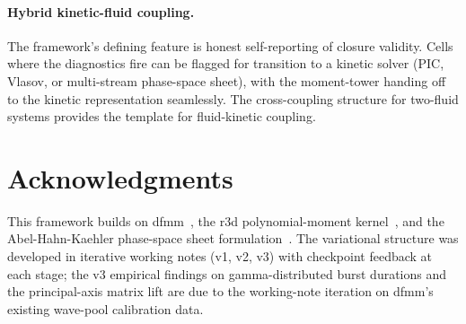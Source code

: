\documentclass[11pt]{article}
\begin{document}
\paragraph{Hybrid kinetic-fluid coupling.} The framework's defining
feature is honest self-reporting of closure validity. Cells where
the diagnostics fire can be flagged for transition to a kinetic
solver (PIC, Vlasov, or multi-stream phase-space sheet), with the
moment-tower handing off to the kinetic representation seamlessly.
The cross-coupling structure for two-fluid systems provides the
template for fluid-kinetic coupling.

\section*{Acknowledgments}

This framework builds on dfmm~\cite{dfmm-paper}, the r3d
polynomial-moment kernel~\cite{r3d-paper}, and the Abel-Hahn-Kaehler
phase-space sheet formulation~\cite{ahk-paper}. The variational
structure was developed in iterative working notes (v1, v2, v3) with
checkpoint feedback at each stage; the v3 empirical findings on
gamma-distributed burst durations and the principal-axis matrix lift
are due to the working-note iteration on dfmm's existing wave-pool
calibration data.
\end{document}
